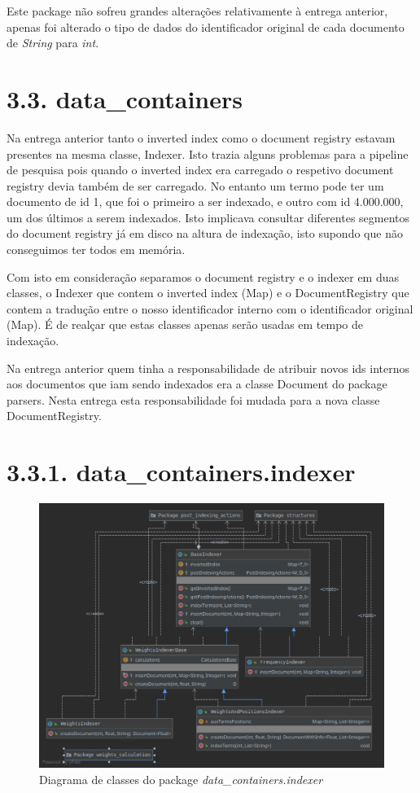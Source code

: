 \documentclass[12pt]{article}
\begin{document}
Este package não sofreu grandes alterações relativamente à entrega
anterior, apenas foi alterado o tipo de dados do identificador
original de cada documento de {\it String} para {\it int}.

\section*{3.3. data\_containers}
Na entrega anterior tanto o inverted index como o document registry
estavam presentes na mesma classe, Indexer.
Isto trazia alguns problemas para a pipeline de pesquisa pois quando
o inverted index era carregado o respetivo document registry devia
também de ser carregado.
No entanto um termo pode ter um documento de id 1, que foi o primeiro
a ser indexado, e outro com id 4.000.000, um dos últimos a serem
indexados.
Isto implicava consultar diferentes segmentos do document registry já
em disco na altura de indexação, isto supondo que não conseguimos ter
todos em memória.

Com isto em consideração separamos o document registry e o indexer em
duas classes, o Indexer que contem o inverted index (Map) e o
DocumentRegistry que contem a tradução entre o nosso identificador
interno com o identificador original (Map).
É de realçar que estas classes apenas serão usadas em tempo de
indexação.

Na entrega anterior quem tinha a responsabilidade de atribuir novos
ids internos aos documentos que iam sendo indexados era a classe
Document do package parsers.
Nesta entrega esta responsabilidade foi mudada para a nova classe
DocumentRegistry.

\section*{3.3.1. data\_containers.indexer}
\begin{figure}[h]
  \center
  \includegraphics[width=\linewidth]{packages_data_containers_indexer.png}
  \caption{Diagrama de classes do package \it
    data\_containers.indexer}
\end{figure}
\end{document}
